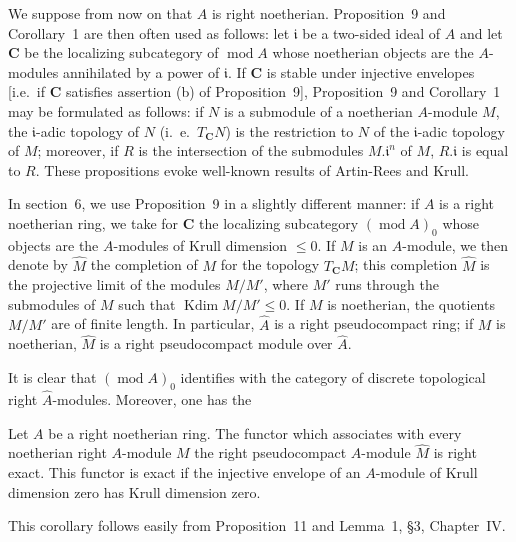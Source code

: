 We suppose from now on that $A$ is right noetherian. Proposition~9 and
Corollary~1 are then often used as follows: let $\mathfrak{i}$ be a
two-sided ideal of $A$ and let $\mathbf{C}$ be the localizing
subcategory of $\operatorname{mod} A$ whose noetherian objects are the
$A$-modules annihilated by a power of $\mathfrak{i}$. If $\mathbf{C}$ is
stable under injective envelopes [i.e.\ if $\mathbf{C}$ satisfies
assertion (b) of Proposition~9], Proposition~9 and Corollary~1 may be formulated as follows:
if $N$ is a submodule of a noetherian $A$-module $M$, the
$\mathfrak{i}$-adic topology of $N$ (i.~e.\ $T_{\mathbf{C}}N$) is the
restriction to $N$ of the $\mathfrak{i}$-adic topology of $M$; moreover,
if $R$ is the intersection of the submodules $M.\mathfrak{i}^n$ of $M$,
$R.\mathfrak{i}$ is equal to $R$. These propositions evoke well-known
results of Artin-Rees and Krull.

In section~6, we use Proposition~9 in a slightly different manner: if
$A$ is a right noetherian ring, we take for $\mathbf{C}$ the localizing
subcategory $(\operatorname{mod} A)_0$ whose objects are the $A$-modules
of Krull dimension $\le 0$. If $M$ is an $A$-module, we then denote by
$\hat{M}$ the completion of $M$ for the topology $T_{\mathbf{C}}M$; this
completion $\hat{M}$ is the projective limit of the modules $M/M'$,
where $M'$ runs through the submodules of $M$ such that
$\operatorname{Kdim} M/M' \le 0$. If $M$ is noetherian, the quotients
$M/M'$ are of finite length. In particular, $\hat{A}$ is a right
pseudocompact ring; if $M$ is noetherian, $\hat{M}$ is a right
pseudocompact module over $\hat{A}$.

It is clear that $(\operatorname{mod} A)_0$ identifies with the category
of discrete topological right $\hat{A}$-modules. Moreover, one has the

\begin{corollary}
Let $A$ be a right noetherian ring. The functor which associates with
every noetherian right $A$-module $M$ the right pseudocompact $A$-module
$\hat{M}$ is right exact. This functor is exact if the injective
envelope of an $A$-module of Krull dimension zero has Krull dimension
zero.
\end{corollary}

This corollary follows easily from Proposition~11 and Lemma~1, \S3,
Chapter~IV.

